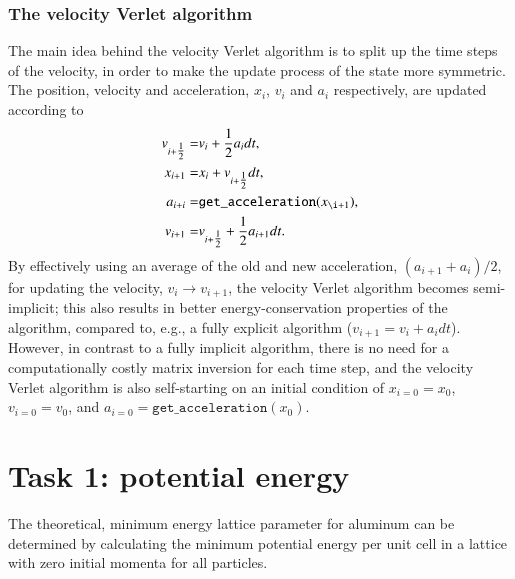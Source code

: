 \subsubsection*{The velocity Verlet algorithm}
The main idea behind the velocity Verlet algorithm is to split up the time steps of the velocity, in order to make the update process of the state more symmetric. The position, velocity and acceleration, $x_i$, $v_i$ and $a_i$\footnotemark{} respectively, are updated according to
\begin{equation}
\begin{aligned}
v_{i+\tfrac{1}{2}}=& v_{i}+\frac{1}{2}a_{i}dt,\\
x_{i+1} =& x_{i} + v_{i+\tfrac{1}{2}}dt,\\
a_{i+i} =& \mathtt{get\_acceleration}(x_{\i+1}),\\
v_{i+1} =& v_{i+\tfrac{1}{2}} + \frac{1}{2}a_{i+1}dt.\\
\end{aligned}
\end{equation}
By effectively using an average of the old and new acceleration, $(a_{i+1}+a_{i})/2$, for updating the velocity, $v_{i}\to v_{i+1}$, the velocity Verlet algorithm becomes semi-implicit; this also results in better energy-conservation properties of the algorithm, compared to, e.g., a fully explicit algorithm ($v_{i+1}=v_{i}+a_{i}dt$). However, in contrast to a fully implicit algorithm, there is no need for a computationally costly matrix inversion for each time step, and the velocity Verlet algorithm is also self-starting on an initial condition of $x_{i=0}=x_0$, $v_{i=0}=v_0$, and $a_{i=0}=\mathtt{get\_acceleration}(x_{0})$.



\section*{Task 1: potential energy}
The theoretical, minimum energy lattice parameter for aluminum can be determined by calculating the minimum potential energy per unit cell in a lattice with zero initial momenta for all particles. 

